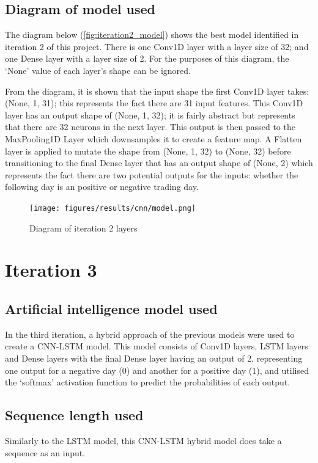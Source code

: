 \subsection{Diagram of model used}
The diagram below (\autoref{fig:iteration2_model}) shows the best model identified in iteration 2 of this project.
There is one Conv1D layer with a layer size of 32; and one Dense layer with a layer size of 2.
For the purposes of this diagram, the `None' value of each layer's shape can be ignored.

From the diagram, it is shown that the input shape the first Conv1D layer takes: (None, 1, 31); this represents the
fact there are 31 input features.  This Conv1D layer has an output shape of (None, 1, 32); it is fairly abstract
but represents that there are 32 neurons in the next layer. This output is then passed to the MaxPooling1D Layer
which downsamples it to create a feature map. A Flatten layer is applied to mutate the shape from (None, 1, 32) to
(None, 32) before transitioning to the final Dense layer that has an output shape of (None, 2)
which represents the fact there are two potential outputs for the inputs: whether the following day
is an positive or negative trading day.

\begin{figure}[ht]
    \centering
    \texttt{[image: figures/results/cnn/model.png]}
    \caption[Diagram of iteration 2 layers]{Diagram of iteration 2 layers}
    \label{fig:iteration2_model}
\end{figure}
\FloatBarrier

\section{Iteration 3}
\subsection{Artificial intelligence model used}\label{ssec:iteration3_ai_model}
In the third iteration, a hybrid approach of the previous models were used to create a CNN-LSTM model.
This model consists of Conv1D layers, LSTM layers and Dense layers with the final Dense layer having an output of 2, representing one output for
a negative day (0) and another for a positive day (1), and utilised the `softmax' activation function to predict the
probabilities of each output.

\subsection{Sequence length used}
Similarly to the LSTM model, this CNN-LSTM hybrid model does take a sequence as an input.

